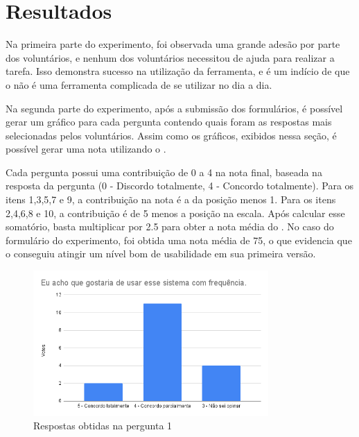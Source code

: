 \documentclass[12pt]{tcc}
\begin{document}
	\section{Resultados}
	\label{section:resultados}

	Na primeira parte do experimento, foi observada uma grande adesão por parte dos voluntários, e nenhum dos voluntários necessitou de ajuda para realizar a tarefa. Isso demonstra sucesso na utilização da ferramenta, e é um indício de que o  não é uma ferramenta complicada de se utilizar no dia a dia.

	Na segunda parte do experimento, após a submissão dos formulários, é possível gerar um gráfico para cada pergunta contendo quais foram as respostas mais selecionadas pelos voluntários. Assim como os gráficos, exibidos nessa seção, é possível gerar uma nota utilizando o .

	Cada pergunta possui uma contribuição de 0 a 4 na nota final, baseada na resposta da pergunta (0 - Discordo totalmente, 4 - Concordo totalmente). Para os itens 1,3,5,7 e 9, a contribuição na nota é a da posição menos 1. Para os itens 2,4,6,8 e 10, a contribuição é de 5 menos a posição na escala. Após calcular esse somatório, basta multiplicar por 2.5 para obter a nota média do  \citep{brooke1995sus}. No caso do formulário do experimento, foi obtida uma nota média de 75, o que evidencia que o  conseguiu atingir um nível bom de usabilidade em sua primeira versão.




	\begin{figure}[!ht]
		\centering
		\includegraphics[width=0.8\textwidth]{figures/respostas-pergunta-1.png}
		\caption{Respostas obtidas na pergunta 1}
		\label{fig:respostas-pergunta-1}
	\end{figure}
\end{document}
